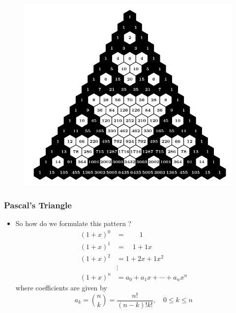 \documentclass{beamer}
\begin{document}
\begin{frame}
    \begin{figure}
        \centering 
        \includegraphics[scale=0.8]{PascalMod2.pdf}
    \end{figure}
\end{frame}

\begin{frame}
    \frametitle{Pascal's Triangle}
    \begin{itemize}
        \item So how do we formulate this pattern ?
        \begin{align*}
            (1+x)^{0} &=\qquad 1 \\
            (1+x)^{1} &=\quad 1+1 x \\
            (1+x)^{2} &= 1+2 x+1 x^{2} \\
            & \vdots \\
            (1+x)^{n} &=a_{0}+a_{1} x+\cdots+a_{n} x^{n} 
        \end{align*}
        where coefficients are given by
        \begin{equation*}
            a_{k}= \binom{n}{k} =\frac{n !}{(n-k) ! k !}, \quad 0 \leq k \leq n
        \end{equation*}
    \end{itemize}
\end{frame}
\end{document}
